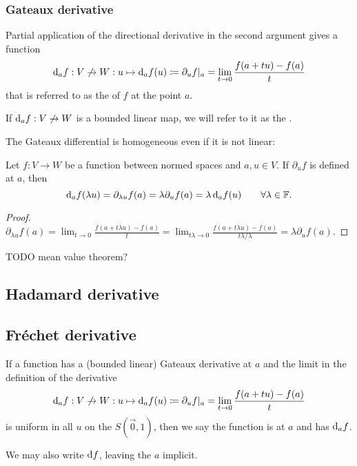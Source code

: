 \subsubsection{Gateaux derivative}
\begin{definition}
Partial application of the directional derivative in the second argument gives a function
\[ \operatorname{d \!}{_af}: V\not\to W: u\mapsto \operatorname{d \!}{_af}(u) \coloneqq \partial_u f|_a = \lim_{t\to 0} \frac{f(a+tu) - f(a)}{t} \]
that is referred to as the  of $f$ at the point $a$.

If $\operatorname{d \!}{_af}: V\not\to W$ is a bounded linear map, we will refer to it as the .
\end{definition}
The Gateaux differential is homogeneous even if it is not linear:
\begin{lemma}
Let $f:V\to W$ be a function between normed spaces and $a,u\in V$. If $\partial_u f$ is defined at $a$, then
\[ \operatorname{d \!}{_a f}(\lambda u) = \partial_{\lambda u}f(a) = \lambda\partial_u f(a) = \lambda \operatorname{d \!}{_a f}(u) \qquad \forall \lambda\in\mathbb{F}. \]
\end{lemma}
\begin{proof}
$\partial_{\lambda u}f(a) = \lim_{t\to 0} \frac{f(a+t\lambda u) - f(a)}{t} = \lim_{t\lambda\to 0} \frac{f(a+t\lambda u) - f(a)}{t \lambda / \lambda} = \lambda\partial_u f(a)$.
\end{proof}

TODO mean value theorem?

\subsection{Hadamard derivative}

\subsection{Fréchet derivative}
\begin{definition}
If a function has a (bounded linear) Gateaux derivative at $a$ and the limit in the definition of the derivative
\[ \operatorname{d \!}{_af}: V\not\to W: u\mapsto \operatorname{d \!}{_af}(u) \coloneqq \partial_u f|_a = \lim_{t\to 0} \frac{f(a+tu) - f(a)}{t} \]
is uniform in all $u$ on the $S(\vec{0},1)$, then we say the function is  at $a$ and has  $\operatorname{d \!}{_af}$.

We may also write $\operatorname{d \!}{f}$, leaving the $a$ implicit.
\end{definition}


